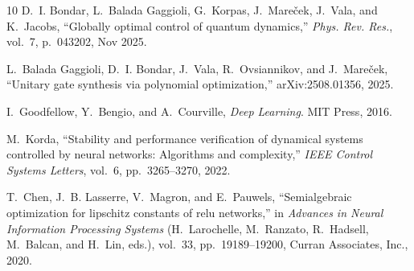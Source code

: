 \documentclass[11pt,a4paper]{article}
\theoremstyle{definition}
\begin{document}
\begin{thebibliography}{10}
D.~I. Bondar, L.~Balada Gaggioli, G.~Korpas, J.~Mare\v cek, J.~Vala, and
  K.~Jacobs, ``Globally optimal control of quantum dynamics,'' {\em Phys. Rev.
  Res.}, vol.~7, p.~043202, Nov 2025.

L.~Balada Gaggioli, D.~I. Bondar, J.~Vala, R.~Ovsiannikov, and J.~Mareček,
  ``Unitary gate synthesis via polynomial optimization,''
arXiv:2508.01356, 2025.

I.~Goodfellow, Y.~Bengio, and A.~Courville, {\em Deep Learning}.
\newblock MIT Press, 2016.

M.~Korda, ``Stability and performance verification of dynamical systems
  controlled by neural networks: Algorithms and complexity,'' {\em IEEE Control
  Systems Letters}, vol.~6, pp.~3265--3270, 2022.

T.~Chen, J.~B. Lasserre, V.~Magron, and E.~Pauwels, ``Semialgebraic
  optimization for lipschitz constants of relu networks,'' in {\em Advances in
  Neural Information Processing Systems} (H.~Larochelle, M.~Ranzato,
  R.~Hadsell, M.~Balcan, and H.~Lin, eds.), vol.~33, pp.~19189--19200, Curran
  Associates, Inc., 2020.


\end{thebibliography}
\end{document}
